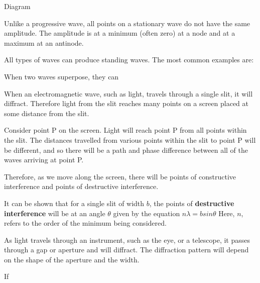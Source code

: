 \documentclass[main.tex]{subfiles}
\begin{document}
Diagram

Unlike a progressive wave, all points on a stationary wave do not have the same amplitude. The amplitude is at a minimum (often zero) at a node and at a maximum at an antinode.

All types of waves can produce standing waves. The most common examples are:


When two waves superpose, they can 




When an electromagnetic wave, such as light, travels through a single slit, it will diffract. Therefore light from the slit reaches many points on a screen placed at some distance from the slit.

Consider point P on the screen. Light will reach point P from all points within the slit. The distances travelled from various points within the slit to point P will be different, and so there will be a path and phase difference between all of the waves arriving at point P.

Therefore, as we move along the screen, there will be points of constructive interference and points of destructive interference. 

It can be shown that for a single slit of width $b$, the points of \textbf{destructive interference} will be at an angle $\theta$ given by the equation
$n\lambda = b sin\theta$
Here, $n$, refers to the order of the minimum being considered.


As light travels through an instrument, such as the eye, or a telescope, it passes through a gap or aperture and will diffract. The diffraction pattern will depend on the shape of the aperture and the width.

If


\end{document}
